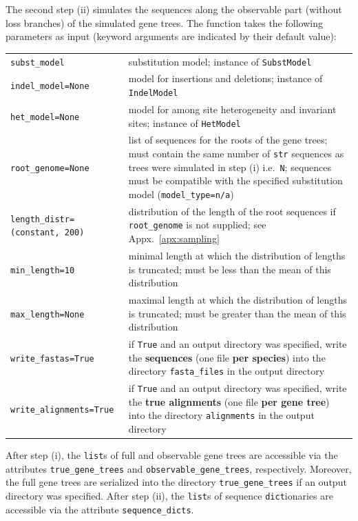 \documentclass[hidelinks,11pt]{article}
\newcommand{\sq}{\textquotesingle}
\begin{document}
The second step (ii) simulates the sequences along the observable part (without loss branches) of the simulated gene trees.
The function takes the following parameters as input (keyword arguments are indicated by their default value):

\vspace{3mm}
{\small\centering
\begin{longtable}{ p{4.5cm} p{9cm} }
	\texttt{subst\_model} & substitution model; instance of \texttt{SubstModel}\\
	\texttt{indel\_model=None} & model for insertions and deletions; instance of \texttt{IndelModel}\\
	\texttt{het\_model=None} & model for among site heterogeneity and invariant sites; instance of \texttt{HetModel}\\
	\texttt{root\_genome=None} & list of sequences for the roots of the gene trees; must contain the same number of \texttt{str} sequences as trees were simulated in step (i) i.e.\ \texttt{N};
	sequences must be compatible with the specified substitution model
	(\texttt{model\_type=\sq n\sq/\sq a\sq})\\
	\texttt{length\_distr=\newline (\sq constant\sq, 200)} & distribution of the
	length of the root sequences if \texttt{root\_genome} is not supplied; see
	Appx.~\ref{apx:sampling}\\
	\texttt{min\_length=10} & minimal length at which the distribution of lengths is truncated; must be less than the mean of this distribution\\
	\texttt{max\_length=None} & maximal length at which the distribution of lengths is truncated; must be greater than the mean of this distribution\\
	\texttt{write\_fastas=True} & if \texttt{True} and an output directory was specified, write the \textbf{sequences} (one file \textbf{per species}) into the directory \texttt{fasta\_files} in the output directory\\
	\texttt{write\_alignments=True} & if \texttt{True} and an output directory was specified, write the \textbf{true alignments} (one file \textbf{per gene tree}) into the directory \texttt{alignments} in the output directory\\
\end{longtable}
}
\vspace{3mm}

After step (i), the \texttt{list}s of full and observable gene trees are accessible via the attributes \texttt{true\_gene\_trees} and \texttt{observable\_gene\_trees}, respectively.
Moreover, the full gene trees are serialized into the directory \texttt{true\_gene\_trees} if an output directory was specified.
After step (ii), the \texttt{list}s of sequence \texttt{dict}ionaries are accessible via the attribute \texttt{sequence\_dicts}.
\end{document}
